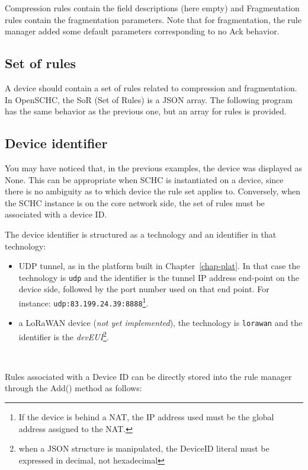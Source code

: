 Compression rules contain the field descriptions (here empty) and Fragmentation rules contain the fragmentation parameters. Note that for fragmentation, the rule manager added some default parameters corresponding to no Ack behavior.



\subsection{Set of rules}

A device should contain a set of rules related to compression and fragmentation. In OpenSCHC, the SoR (Set of Rules) is a JSON array. The following program has the same behavior as the previous one, but an array for rules is provided.


\subsection{Device identifier}

You may have noticed that, in the previous examples, the device was displayed as None. This can be appropriate when SCHC is instantiated on a device, since there is no ambiguity as to which device the rule set applies to. Conversely, when the SCHC instance is on the core network side, the set of rules must be associated with a device ID.

The device identifier is structured as a technology and an identifier in that technology:
\begin{itemize}
\item UDP tunnel, as in the platform built in Chapter~\vref{chap-plat}. In that case the technology is \texttt{udp} and the identifier is the tunnel IP address end-point on the device side, followed by the port number used on that end point. For instance: \texttt{udp:83.199.24.39:8888}\footnote{If the device is behind a NAT, the IP address used must be the global address assigned to the NAT.}. 
\item a LoRaWAN device (\textit{not yet implemented}), the technology is \texttt{lorawan} and the identifier is the \textit{devEUI}\footnote{when a JSON structure is manipulated, the DeviceID literal must be expressed in decimal, not hexadecimal}.

\end{itemize}

~~

Rules associated with a Device ID can be directly stored into the rule manager through the Add() method as follows:

